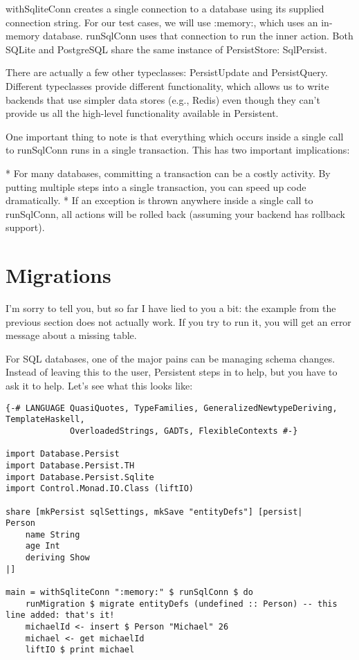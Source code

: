 withSqliteConn creates a single connection to a database using its supplied connection string. For our test cases, we will use :memory:, which uses an in-memory database. runSqlConn uses that connection to run the inner action. Both SQLite and PostgreSQL share the same instance of PersistStore: SqlPersist.

There are actually a few other typeclasses: PersistUpdate and PersistQuery. Different typeclasses provide different functionality, which allows us to write backends that use simpler data stores (e.g., Redis) even though they can't provide us all the high-level functionality available in Persistent.

One important thing to note is that everything which occurs inside a single call to runSqlConn runs in a single transaction. This has two important implications:

* For many databases, committing a transaction can be a costly activity. By putting multiple steps into a single transaction, you can speed up code dramatically.
* If an exception is thrown anywhere inside a single call to runSqlConn, all actions will be rolled back (assuming your backend has rollback support).

\section{Migrations}

I'm sorry to tell you, but so far I have lied to you a bit: the example from the previous section does not actually work. If you try to run it, you will get an error message about a missing table.

For SQL databases, one of the major pains can be managing schema changes. Instead of leaving this to the user, Persistent steps in to help, but you have to ask it to help. Let's see what this looks like:

\begin{lstlisting}
{-# LANGUAGE QuasiQuotes, TypeFamilies, GeneralizedNewtypeDeriving, TemplateHaskell,
             OverloadedStrings, GADTs, FlexibleContexts #-}

import Database.Persist
import Database.Persist.TH
import Database.Persist.Sqlite
import Control.Monad.IO.Class (liftIO)

share [mkPersist sqlSettings, mkSave "entityDefs"] [persist|
Person
    name String
    age Int
    deriving Show
|]

main = withSqliteConn ":memory:" $ runSqlConn $ do
    runMigration $ migrate entityDefs (undefined :: Person) -- this line added: that's it!
    michaelId <- insert $ Person "Michael" 26
    michael <- get michaelId
    liftIO $ print michael
\end{lstlisting}%

